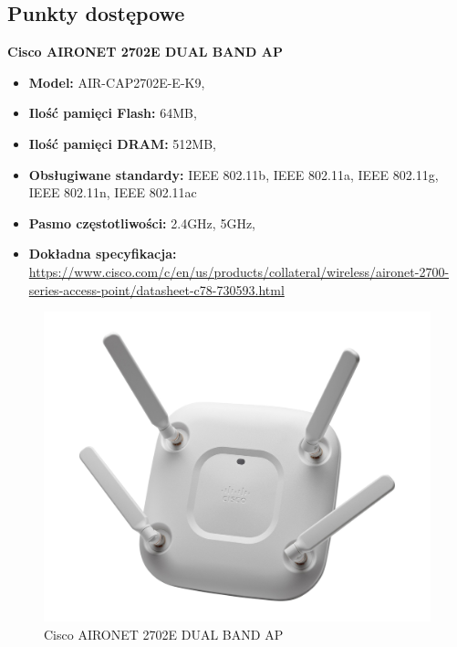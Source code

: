 \documentclass[12pt,a4paper,titlepage]{article}
\begin{document}
\subsection{Punkty dostępowe}
\textbf{Cisco AIRONET 2702E DUAL BAND AP}
\begin{itemize}
    \item \textbf{Model:} AIR-CAP2702E-E-K9,
    \item \textbf{Ilość pamięci Flash:} 64MB,
    \item \textbf{Ilość pamięci DRAM:} 512MB,
    \item \textbf{Obsługiwane standardy:} IEEE 802.11b, IEEE 802.11a, IEEE 802.11g, IEEE 802.11n, IEEE 802.11ac
    \item \textbf{Pasmo częstotliwości:} 2.4GHz, 5GHz,  
    \item \textbf{Dokładna specyfikacja:} \url{https://www.cisco.com/c/en/us/products/collateral/wireless/aironet-2700-series-access-point/datasheet-c78-730593.html}
\end{itemize}
\begin{figure}[H]
  \centering
    \includegraphics[width=14cm]{images/ap.jpg}
    \caption{Cisco AIRONET 2702E DUAL BAND AP}
    \label{fig:ap}
\end{figure}

\newpage
\end{document}

